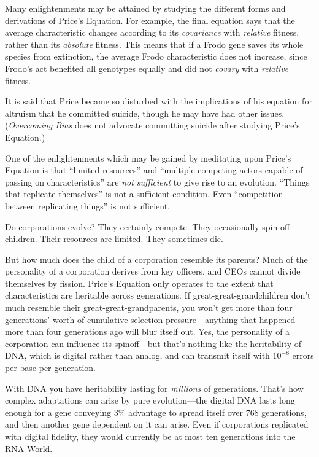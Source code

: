 {
 Many enlightenments may be attained by studying the different
forms and derivations of Price's Equation. For example,
the final equation says that the average characteristic changes
according to its \textit{covariance} with \textit{relative} fitness,
rather than its \textit{absolute} fitness. This means that if a Frodo
gene saves its whole species from extinction, the average Frodo
characteristic does not increase, since Frodo's act
benefited all genotypes equally and did not \textit{covary} with
\textit{relative} fitness.}

{
 It is said that Price became so disturbed with the implications of
his equation for altruism that he committed suicide, though he may have
had other issues. (\textit{Overcoming Bias} does not advocate
committing suicide after studying Price's Equation.)}

{
 One of the enlightenments which may be gained by meditating upon
Price's Equation is that ``limited
resources'' and ``multiple competing
actors capable of passing on characteristics'' are
\textit{not sufficient} to give rise to an evolution.
``Things that replicate themselves''
is not a sufficient condition. Even ``competition
between replicating things'' is not sufficient.}

{
 Do corporations evolve? They certainly compete. They occasionally
spin off children. Their resources are limited. They sometimes die.}

{
 But how much does the child of a corporation resemble its parents?
Much of the personality of a corporation derives from key officers, and
CEOs cannot divide themselves by fission. Price's
Equation only operates to the extent that characteristics are heritable
across generations. If great-great-grandchildren don't
much resemble their great-great-grandparents, you won't
get more than four generations' worth of cumulative
selection pressure---anything that happened more than four generations
ago will blur itself out. Yes, the personality of a corporation can
influence its spinoff---but that's nothing like the
heritability of DNA, which is digital rather than analog, and can
transmit itself with $10^{-8}$ errors per base per
generation.}

{
 With DNA you have heritability lasting for \textit{millions} of
generations. That's how complex adaptations can arise
by pure evolution---the digital DNA lasts long enough for a gene
conveying 3\% advantage to spread itself over 768 generations, and then
another gene dependent on it can arise. Even if corporations replicated
with digital fidelity, they would currently be at most ten generations
into the RNA World.}

